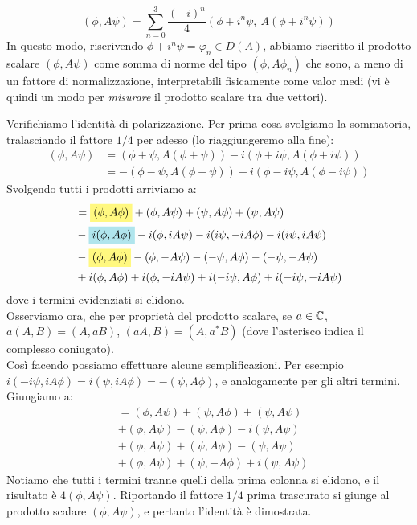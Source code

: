 \documentclass[FisicaTeorica.tex]{subfiles}
\begin{document}
\begin{enumerate}
	\[
	\left(\phi, A\psi\right)= \sum_{n=0}^{3}{\frac{\left(-i\right)^n}{4}(\phi+i^n\psi,\ A\left(\phi+i^n\psi\right))}
	\]
	In questo modo, riscrivendo $\phi + i^n\psi = \varphi_n \in D(A)$, abbiamo riscritto il prodotto scalare $(\phi, A\psi)$ come somma di norme del tipo $(\phi, A\phi_n)$ che sono, a meno di un fattore di normalizzazione, interpretabili fisicamente come valor medi (vi è quindi un modo per \textit{misurare} il prodotto scalare tra due vettori).
	\begin{mdframed}[hidealllines=true,backgroundcolor=green!20,innerleftmargin=3pt,innerrightmargin=3pt,leftmargin=-3pt,rightmargin=-3pt]
	Verifichiamo l'identità di polarizzazione. Per prima cosa svolgiamo la sommatoria, tralasciando il fattore $1/4$ per adesso (lo riaggiungeremo alla fine):
	\begin{align*}
	    (\phi, A\psi) &= (\phi+\psi, A(\phi +\psi))-i(\phi+i\psi, A(\phi+i\psi))\\
	    &= -(\phi-\psi, A(\phi-\psi)) +i(\phi-i\psi,A(\phi-i\psi))
	\end{align*}
	Svolgendo tutti i prodotti arriviamo a:
	\begin{align*}
	    &= \hlc{Yellow}{(\phi,A\phi)} + (\phi,A\psi) + (\psi,A\phi) + (\psi,A\psi)\\
	    &- \hlc{SkyBlue}{i(\phi,A\phi)} -i(\phi, iA\psi) -i(i\psi, -iA\phi) -i(i\psi, iA\psi)\\
	    &- \hlc{Yellow}{(\phi,A\phi)}  -(\phi, -A\psi) -(-\psi, A\phi) -(-\psi, -A\psi)\\
	    &+ i(\phi, A\phi) + i(\phi, -iA\psi) +i(-i\psi, A\phi) + i(-i\psi, -iA\psi)
	\end{align*}
	dove i termini evidenziati si elidono.\\
	Osserviamo ora, che per proprietà del prodotto scalare, se $a\in \mathbb{C}$, $a(A,B) = (A,aB)$, $(aA,B) = (A, a^* B)$ (dove l'asterisco indica il complesso coniugato).\\
	Così facendo possiamo effettuare alcune semplificazioni. Per esempio $i(-i\psi, iA\phi) = i(\psi,iA\phi) = -(\psi,A\phi)$, e analogamente per gli altri termini.\\
	Giungiamo a:
	\begin{align*}
	    &= (\phi,A\psi)+(\psi, A\phi)+(\psi, A\psi)\\
	    &+ (\phi, A\psi) -(\psi,A\phi) -i(\psi,A\psi)\\
	    &+ (\phi, A\psi) +(\psi,A\phi) -(\psi, A\psi)\\
	    &+ (\phi, A\psi) + (\psi, -A\phi) +i(\psi,A\psi)
	\end{align*}
	Notiamo che tutti i termini tranne quelli della prima colonna si elidono, e il risultato è $4(\phi, A\psi)$. Riportando il fattore $1/4$ prima trascurato si giunge al prodotto scalare $(\phi, A\psi)$, e pertanto l'identità è dimostrata.
	\end{mdframed}
	

\end{enumerate}
\end{document}

